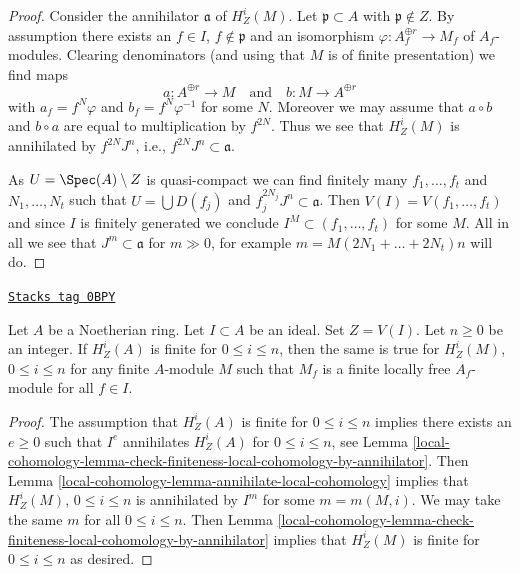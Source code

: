 \begin{proof}
Consider the annihilator $\mathfrak a$ of $H^i_Z(M)$.
Let $\mathfrak p \subset A$ with $\mathfrak p \not \in Z$.
By assumption there exists an $f \in I$, $f \not \in \mathfrak p$
and an isomorphism $\varphi : A_f^{\oplus r} \to M_f$
of $A_f$-modules. Clearing denominators (and using that
$M$ is of finite presentation) we find maps
$$
a : A^{\oplus r} \longrightarrow M
\quad\text{and}\quad
b : M \longrightarrow A^{\oplus r}
$$
with $a_f = f^N \varphi$ and $b_f = f^N \varphi^{-1}$ for some $N$.
Moreover we may assume that $a \circ b$ and $b \circ a$ are equal to
multiplication by $f^{2N}$. Thus we see that $H^i_Z(M)$ is annihilated by
$f^{2N}J^n$, i.e., $f^{2N}J^n \subset \mathfrak a$.

\medskip\noindent
As $U = \Spec(A) \setminus Z$ is quasi-compact we can find finitely many
$f_1, \ldots, f_t$ and $N_1, \ldots, N_t$ such that $U = \bigcup D(f_j)$ and
$f_j^{2N_j}J^n \subset \mathfrak a$. Then $V(I) = V(f_1, \ldots, f_t)$
and since $I$ is finitely generated we conclude
$I^M \subset (f_1, \ldots, f_t)$ for some $M$.
All in all we see that $J^m \subset \mathfrak a$ for
$m \gg 0$, for example $m = M (2N_1 + \ldots + 2N_t) n$ will do.
\end{proof}

\begin{lemma}
\label{local-cohomology-lemma-local-finiteness-for-finite-locally-free}
\href{https://stacks.math.columbia.edu/tag/0BPY}{\texttt{Stacks tag 0BPY}}

Let $A$ be a Noetherian ring. Let $I \subset A$ be an ideal. Set $Z = V(I)$.
Let $n \geq 0$ be an integer. If $H^i_Z(A)$ is finite for $0 \leq i \leq n$,
then the same is true for $H^i_Z(M)$, $0 \leq i \leq n$ for
any finite $A$-module $M$ such that $M_f$ is a finite locally free
$A_f$-module for all $f \in I$.
\end{lemma}

\begin{proof}
The assumption that $H^i_Z(A)$ is finite for $0 \leq i \leq n$
implies there exists an $e \geq 0$ such that $I^e$ annihilates
$H^i_Z(A)$ for $0 \leq i \leq n$, see
Lemma \ref{local-cohomology-lemma-check-finiteness-local-cohomology-by-annihilator}.
Then Lemma \ref{local-cohomology-lemma-annihilate-local-cohomology}
implies that $H^i_Z(M)$, $0 \leq i \leq n$ is annihilated
by $I^m$ for some $m = m(M, i)$. We may take the same $m$
for all $0 \leq i \leq n$. Then
Lemma \ref{local-cohomology-lemma-check-finiteness-local-cohomology-by-annihilator}
implies that $H^i_Z(M)$ is finite for $0 \leq i \leq n$
as desired.
\end{proof}

